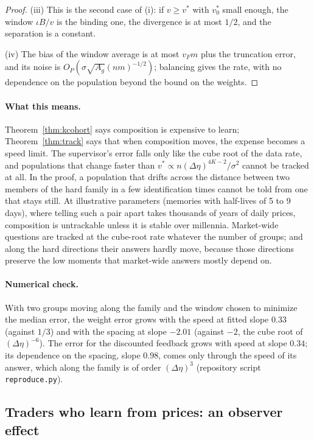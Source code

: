 \documentclass[12pt]{article}
\theoremstyle{definition}
\theoremstyle{remark}
\begin{document}
\begin{proof}
(iii) This is the second case of (i): if $v\ge v^*$ with $v^*_0$ small enough, the window $\iota B/v$ is the binding one, the divergence is at most $1/2$, and the separation is a constant.

(iv) The bias of the window average is at most $v_Fm$ plus the truncation error, and its noise is $O_P(\sigma\sqrt{A_g}(nm)^{-1/2})$; balancing gives the rate, with no dependence on the population beyond the bound on the weights.
\end{proof}

\paragraph{What this means.} Theorem~\ref{thm:kcohort} says composition is expensive to learn; Theorem~\ref{thm:track} says that when composition moves, the expense becomes a speed limit. The supervisor's error falls only like the cube root of the data rate, and populations that change faster than $v^*\propto n(\Delta\eta)^{4K-2}/\sigma^2$ cannot be tracked at all. In the proof, a population that drifts across the distance between two members of the hard family in a few identification times cannot be told from one that stays still. At illustrative parameters (memories with half-lives of 5 to 9 days), where telling such a pair apart takes thousands of years of daily prices, composition is untrackable unless it is stable over millennia. Market-wide questions are tracked at the cube-root rate whatever the number of groups; and along the hard directions their answers hardly move, because those directions preserve the low moments that market-wide answers mostly depend on.

\paragraph{Numerical check.} With two groups moving along the family and the window chosen to minimize the median error, the weight error grows with the speed at fitted slope $0.33$ (against $1/3$) and with the spacing at slope $-2.01$ (against $-2$, the cube root of $(\Delta\eta)^{-6}$). The error for the discounted feedback grows with speed at slope $0.34$; its dependence on the spacing, slope $0.98$, comes only through the speed of its answer, which along the family is of order $(\Delta\eta)^3$ (repository script \nolinkurl{reproduce.py}).

\subsection{Traders who learn from prices: an observer effect}
\end{document}
